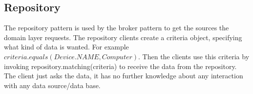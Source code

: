 %
%
%
%

\subsection{Repository}

The repository pattern is used by the broker pattern to get the sources the domain layer requests. The repository clients create a criteria object, specifying what kind of data is wanted. For example $criteria.equals(Device.NAME, Computer)$. Then the clients use this criteria by invoking repository.matching(criteria) to receive the data from the repository. The client just asks the data, it has no further knowledge about any interaction with any data source/data base.

